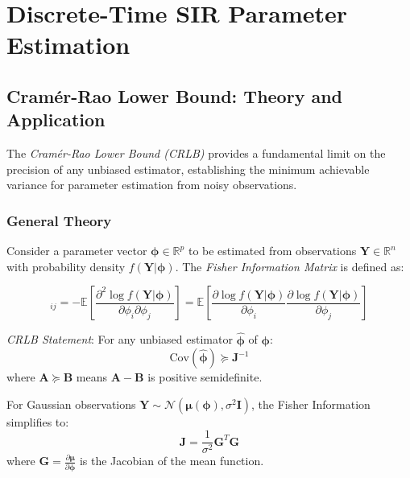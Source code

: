 \section{Discrete-Time SIR Parameter Estimation}

\subsection{Cramér-Rao Lower Bound: Theory and Application}

The \emph{Cramér-Rao Lower Bound (CRLB)} provides a fundamental limit on the precision of any unbiased estimator, establishing the minimum achievable variance for parameter estimation from noisy observations.

\subsubsection{General Theory}

Consider a parameter vector $\boldsymbol{\phi} \in \mathbb{R}^p$ to be
estimated from observations $\mathbf{Y} \in \mathbb{R}^n$ with
probability density $f(\mathbf{Y}|\boldsymbol{\phi})$. The
\emph{Fisher Information Matrix} is defined as:

\begin{equation}
[\mathbf{J}]_{ij} = -\mathbb{E}\left[\frac{\partial^2 \log
    f(\mathbf{Y}|\boldsymbol{\phi})}{\partial \phi_i \partial
    \phi_j}\right] = \mathbb{E}\left[\frac{\partial \log
    f(\mathbf{Y}|\boldsymbol{\phi})}{\partial \phi_i}\frac{\partial
    \log f(\mathbf{Y}|\boldsymbol{\phi})}{\partial \phi_j}\right]
\end{equation}

\emph{CRLB Statement}: For any unbiased estimator $\hat{\boldsymbol{\phi}}$ of $\boldsymbol{\phi}$:
\begin{equation}
\text{Cov}(\hat{\boldsymbol{\phi}}) \succeq \mathbf{J}^{-1}
\end{equation}
where $\mathbf{A} \succeq \mathbf{B}$ means $\mathbf{A} - \mathbf{B}$ is positive semidefinite.

For Gaussian observations $\mathbf{Y} \sim
\mathcal{N}(\boldsymbol{\mu}(\boldsymbol{\phi}), \sigma^2
\mathbf{I})$, the Fisher Information simplifies to:
\begin{equation}
\mathbf{J} = \frac{1}{\sigma^2} \mathbf{G}^T \mathbf{G}
\end{equation}
where $\mathbf{G} = \frac{\partial \boldsymbol{\mu}}{\partial \boldsymbol{\phi}}$ is the Jacobian of the mean function.

